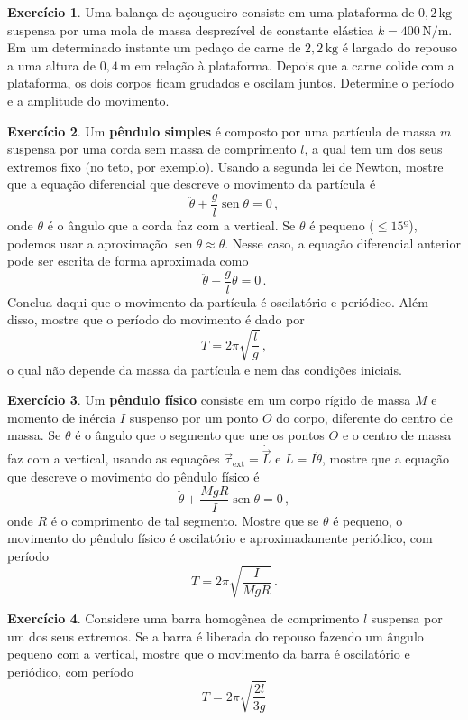 \documentclass[12pt,a4paper]{article}
\theoremstyle{definition}
\newtheorem{ex}{Exercício}[section]
\DeclareMathOperator{\sen}{sen}
\begin{document}
\begin{ex}
  Uma balança de açougueiro consiste em uma plataforma de
  $0{,}2\,\mathrm{kg}$ suspensa por uma mola de massa desprezível de
  constante elástica $k=400\,\mathrm{N/m}$. Em um determinado instante
  um pedaço de carne de $2{,}2\,\mathrm{kg}$ é largado do repouso a
  uma altura de $0{,}4\,\mathrm{m}$ em relação à plataforma. Depois
  que a carne colide com a plataforma, os dois corpos ficam grudados e
  oscilam juntos. Determine o período e a amplitude do movimento.
\end{ex}

\begin{ex}
  Um \textbf{pêndulo simples} é composto por uma partícula de massa
  $m$ suspensa por uma corda sem massa de comprimento $l$, a qual tem
  um dos seus extremos fixo (no teto, por exemplo). Usando a segunda
  lei de Newton, mostre que a equação diferencial que descreve o
  movimento da partícula é
  $$\ddot\theta+\frac{g}{l}\sen\theta=0\,,$$
  onde $\theta$ é o ângulo que a corda faz com a vertical. Se $\theta$
  é pequeno ($\le 15º$), podemos usar a aproximação
  $\sen\theta\approx \theta$. Nesse caso, a equação diferencial
  anterior pode ser escrita de forma aproximada como
  $$\ddot\theta+\frac{g}{l}\theta=0\,.$$
  Conclua daqui que o movimento da partícula é oscilatório e
  periódico. Além disso, mostre que o período do movimento é dado por
  $$T=2\pi\sqrt{\frac{l}{g}}\,,$$
  o qual não depende da massa da partícula e nem das condições
  iniciais.
\end{ex}

\begin{ex}
  Um \textbf{pêndulo físico} consiste em um corpo rígido de massa $M$
  e momento de inércia $I$ suspenso por um ponto $O$ do corpo,
  diferente do centro de massa. Se $\theta$ é o ângulo que o segmento
  que une os pontos $O$ e o centro de massa faz com a vertical, usando
  as equações $\vec\tau_\mathrm{ext}=\dot{\vec L}$ e $L=I\dot\theta$,
  mostre que a equação que descreve o movimento do pêndulo físico é
  $$\ddot\theta+\frac{MgR}{I}\sen\theta=0\,,$$
  onde $R$ é o comprimento de tal segmento. Mostre que se $\theta$ é
  pequeno, o movimento do pêndulo físico é oscilatório e
  aproximadamente periódico, com período
  $$T=2\pi\sqrt{\frac{I}{MgR}}\,.$$
\end{ex}

\begin{ex}
  Considere uma barra homogênea de comprimento $l$ suspensa por um dos
  seus extremos. Se a barra é liberada do repouso fazendo um ângulo
  pequeno com a vertical, mostre que o movimento da barra é
  oscilatório e periódico, com período
  $$T=2\pi\sqrt{\frac{2l}{3g}}$$
\end{ex}
\end{document}
